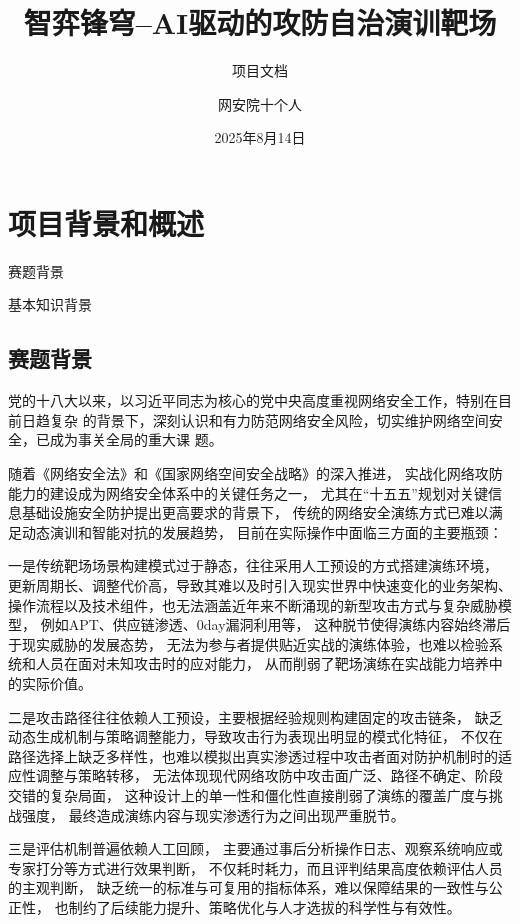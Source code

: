 \documentclass[lang=cn,10pt]{elegantbook}
\title{智弈锋穹--AI驱动的攻防自治演训靶场}
\subtitle{项目文档}
\author{网安院十个人}
\institute{武汉大学 国家网络安全学院}
\date{2025年8月14日}
\begin{document}
\maketitle
\frontmatter

\tableofcontents

\mainmatter


\chapter{项目背景和概述}
\begin{introduction}
    \item 赛题背景
    \item 基本知识背景
\end{introduction}

\section{赛题背景}

党的十八大以来，以习近平同志为核心的党中央高度重视网络安全工作，特别在目前日趋复杂
的背景下，深刻认识和有力防范网络安全风险，切实维护网络空间安全，已成为事关全局的重大课
题。

随着《网络安全法》和《国家网络空间安全战略》的深入推进，
实战化网络攻防能力的建设成为网络安全体系中的关键任务之一，
尤其在“十五五”规划对关键信息基础设施安全防护提出更高要求的背景下，
传统的网络安全演练方式已难以满足动态演训和智能对抗的发展趋势，
目前在实际操作中面临三方面的主要瓶颈：

一是传统靶场场景构建模式过于静态，往往采用人工预设的方式搭建演练环境，
更新周期长、调整代价高，导致其难以及时引入现实世界中快速变化的业务架构、
操作流程以及技术组件，也无法涵盖近年来不断涌现的新型攻击方式与复杂威胁模型，
例如APT、供应链渗透、0day漏洞利用等，
这种脱节使得演练内容始终滞后于现实威胁的发展态势，
无法为参与者提供贴近实战的演练体验，也难以检验系统和人员在面对未知攻击时的应对能力，
从而削弱了靶场演练在实战能力培养中的实际价值。

二是攻击路径往往依赖人工预设，主要根据经验规则构建固定的攻击链条，
缺乏动态生成机制与策略调整能力，导致攻击行为表现出明显的模式化特征，
不仅在路径选择上缺乏多样性，也难以模拟出真实渗透过程中攻击者面对防护机制时的适应性调整与策略转移，
无法体现现代网络攻防中攻击面广泛、路径不确定、阶段交错的复杂局面，
这种设计上的单一性和僵化性直接削弱了演练的覆盖广度与挑战强度，
最终造成演练内容与现实渗透行为之间出现严重脱节。

三是评估机制普遍依赖人工回顾，
主要通过事后分析操作日志、观察系统响应或专家打分等方式进行效果判断，
不仅耗时耗力，而且评判结果高度依赖评估人员的主观判断，
缺乏统一的标准与可复用的指标体系，难以保障结果的一致性与公正性，
也制约了后续能力提升、策略优化与人才选拔的科学性与有效性。
\end{document}
